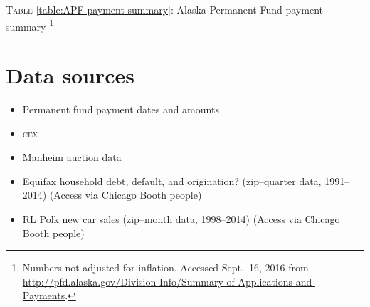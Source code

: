 \documentclass[11pt,letterpaper,oneside]{article}
\newcommand{\cex}{\textsc{cex}}
\begin{document}
\noindent\begin{minipage}{\textwidth}
	\centering
	\label{table:APF-payment-summary}
	\textsc{Table} \ref{table:APF-payment-summary}: Alaska Permanent Fund payment summary%
	\footnote{Numbers not adjusted for inflation. Accessed Sept.\ 16, 2016 from \url{http://pfd.alaska.gov/Division-Info/Summary-of-Applications-and-Payments}.}

	\vspace{1em}
    
\end{minipage}

\section{Data sources}

\begin{itemize}
    \item Permanent fund payment dates and amounts
    \item \cex
    \item Manheim auction data
    \item Equifax household debt, default, and origination? (zip--quarter data, 1991--2014)  (Access via Chicago Booth people)
    \item RL Polk new car sales (zip--month data, 1998--2014)  (Access via Chicago Booth people)
\end{itemize}
\printbibliography
\end{document}
